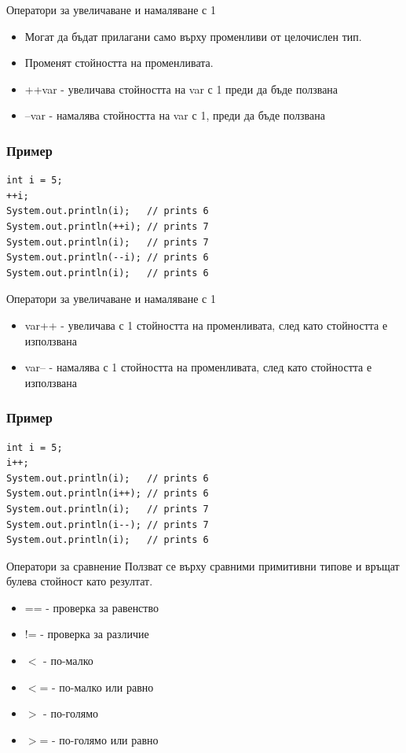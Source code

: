 \documentclass{beamer}
\begin{document}
\begin{frame}{Оператори за увеличаване и намаляване с 1}
  \transdissolve
  \begin{itemize}
  \item Могат да бъдат прилагани само върху
    променливи от целочислен тип. \pause
   \item Променят стойността на променливата. \pause
   \item ++var - увеличава стойността на var с 1
    преди да бъде ползвана \pause
   \item --var - намалява стойността на var с 1,
    преди да бъде ползвана \pause
  \end{itemize}
\end{frame}

\begin{frame}[fragile]
  \frametitle{Пример}
  \transdissolve
\begin{lstlisting}
int i = 5;
++i;
System.out.println(i);   // prints 6
System.out.println(++i); // prints 7
System.out.println(i);   // prints 7
System.out.println(--i); // prints 6
System.out.println(i);   // prints 6
\end{lstlisting}
\end{frame}

\begin{frame}{Оператори за увеличаване и намаляване с 1}
  \transdissolve
  \begin{itemize}
  \item var++ - увеличава с 1 стойността на
    променливата, след като стойността е
    използвана \pause
  \item var-- - намалява с 1 стойността на
    променливата, след като стойността е
    използвана \pause
  \end{itemize}
\end{frame}

\begin{frame}[fragile]
  \frametitle{Пример}
  \transdissolve
\begin{lstlisting}
int i = 5;
i++;
System.out.println(i);   // prints 6
System.out.println(i++); // prints 6
System.out.println(i);   // prints 7
System.out.println(i--); // prints 7
System.out.println(i);   // prints 6
\end{lstlisting}
\end{frame}

\begin{frame}{Оператори за сравнение}
  \transdissolve
  Ползват се върху сравними примитивни
  типове и връщат булева стойност като резултат. \pause
  
  \begin{itemize}
  \item == - проверка за равенство
  \item != - проверка за различие
  \item $<$  - по-малко
  \item $<$= - по-малко или равно
  \item $>$  - по-голямо
  \item $>$= - по-голямо или равно
  \end{itemize}
\end{frame}
\end{document}
